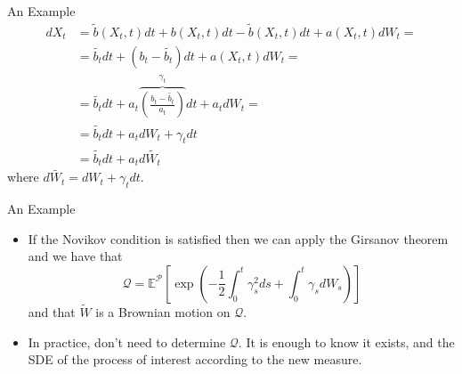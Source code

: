 \documentclass{beamer}
\begin{document}
\begin{frame}{An Example}
  \begin{equation*}
    \begin{aligned}
      dX_t &= \tilde{b}(X_t,t) dt+b(X_t,t) dt -\tilde{b}(X_t,t) dt + a(X_t,t) dW_t = \\
      &=\tilde{b_t} dt + (b_t -\tilde{b_t})dt + a(X_t,t) dW_t =\\
      &=\tilde{b_t}dt+ a_t\overbrace{\left(\frac{b_t-\tilde{b_t}}{a_t}\right)}^{\gamma_t}dt + a_t dW_t = \\
      &= \tilde{b_t}dt+a_t dW_t + \gamma_t dt\\
      &=\tilde{b_t}dt+a_t d\tilde{W_t}
    \end{aligned}
  \end{equation*}
  where $d\tilde{W_t}=dW_t+\gamma_t dt$.
\end{frame}

\begin{frame}{An Example}
  \begin{itemize}
  \item If the Novikov condition is satisfied then we can apply the Girsanov theorem and we have that
    \begin{equation}
      \mathcal{Q} = \mathbb{E}^\mathcal{P}\left[\exp\left(-\frac{1}{2}\int_0^t \gamma_s^2 ds + \int_0^t \gamma_s dW_s \right)\right]
    \end{equation}
    and that $\tilde{W}$ is a Brownian motion on $\mathcal{Q}$.
  \item In practice, don't need to determine $\mathcal{Q}$. It is enough to know it exists, and the SDE of the process of interest according to the new measure.	
  \end{itemize}
\end{frame}
\end{document}

